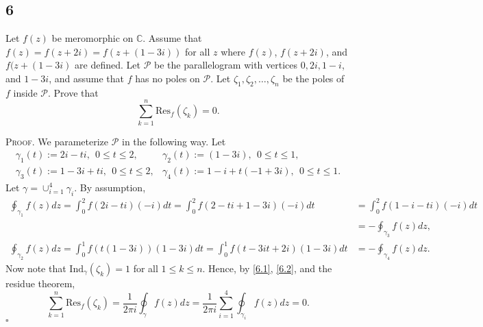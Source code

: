 \documentclass[12pt]{article}
\newcounter{ProofCounter}
\newenvironment{Proof}{\stepcounter{ProofCounter}\textsc{Proof.}}{\hfill$\square$}
\begin{document}
\subsection*{6}
\begin{tcolorbox}
Let $f(z)$ be meromorphic on $\mathbb{C}$. Assume that $f(z) = f(z + 2i) = f(z + (1-3i))$ for all $z$ where $f(z)$, $f(z + 2i)$, and $f(z + (1-3i)$
are defined. Let $\mathcal{P}$ be the parallelogram with vertices $0, 2i, 1- i$, and $1 - 3i$, and assume that $f$ has no poles on $\mathcal{P}$. Let
$\zeta_{1}, \zeta_{2}, \hdots, \zeta_{n}$ be the poles of $f$ inside $\mathcal{P}$. Prove that 
\[ \sum_{k=1}^{n}\text{Res}_{f}(\zeta_{k}) = 0. \]
\end{tcolorbox}
\begin{Proof}
We parameterize $\mathcal{P}$ in the following way. Let 
\[ 
\begin{array}{ll}
\gamma_{1}(t) := 2i - ti, \ \  0 \leq t \leq 2, & \gamma_{2}(t) := (1-3i), \ \ 0 \leq t \leq 1, \\
\gamma_{3}(t) := 1 - 3i + ti, \ \ 0 \leq t \leq 2, & \gamma_{4}(t) := 1 - i + t(-1 + 3i), \ \ 0 \leq t \leq 1.
\end{array}
\]
Let $\gamma = \cup_{i=1}^{4}\gamma_{i}$. By assumption,
\begin{align}
\oint_{\gamma_{1}}f(z)dz = \int_{0}^{2}f(2i - ti)(-i)dt = \int_{0}^{2}f(2 - ti + 1 - 3i)(-i)dt & = \int_{0}^{2}f(1 - i -ti)(-i)dt \nonumber \\
& = -\oint_{\gamma_{3}}f(z)dz, \label{6.1} \\
\oint_{\gamma_{2}}f(z)dz = \int_{0}^{1}f(t(1-3i))(1-3i)dt = \int_{0}^{1}f(t - 3it + 2i)(1 - 3i)dt & = -\oint_{\gamma_{4}}f(z)dz. \label{6.2}
\end{align}
Now note that $\text{Ind}_{\gamma}(\zeta_{k}) = 1$ for all $1 \leq k \leq n$. Hence,
by \eqref{6.1}, \eqref{6.2}, and the residue theorem,
\[ \sum_{k=1}^{n}\text{Res}_{f}(\zeta_{k})  = \frac{1}{2\pi i}\oint_{\gamma}f(z)dz = \frac{1}{2\pi i}\sum_{i=1}^{4}\oint_{\gamma_{i}}f(z)dz = 0. \]
\end{Proof}

\newpage 
\end{document}
